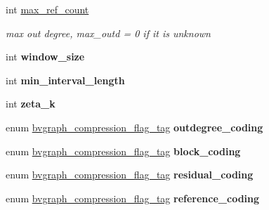 \begin{DoxyCompactItemize}
\item 
\hypertarget{structbvgraph__tag_a1acf7e4fb2fa3ba2f04dbc36933bd932}{int \hyperlink{structbvgraph__tag_a1acf7e4fb2fa3ba2f04dbc36933bd932}{max\+\_\+ref\+\_\+count}}\label{structbvgraph__tag_a1acf7e4fb2fa3ba2f04dbc36933bd932}

\begin{DoxyCompactList}\small\item\em max out degree, max\+\_\+outd = 0 if it is unknown \end{DoxyCompactList}\item 
\hypertarget{structbvgraph__tag_a69c3c3dbd6e4f186c34c31069b6c2c4c}{int {\bfseries window\+\_\+size}}\label{structbvgraph__tag_a69c3c3dbd6e4f186c34c31069b6c2c4c}

\item 
\hypertarget{structbvgraph__tag_a9ee97f273e2de17699a1da8e6c5caf62}{int {\bfseries min\+\_\+interval\+\_\+length}}\label{structbvgraph__tag_a9ee97f273e2de17699a1da8e6c5caf62}

\item 
\hypertarget{structbvgraph__tag_aa459ab6c562f5c09f9d6563a6fb4b8aa}{int {\bfseries zeta\+\_\+k}}\label{structbvgraph__tag_aa459ab6c562f5c09f9d6563a6fb4b8aa}

\item 
\hypertarget{structbvgraph__tag_a6e5fafe969bd141ec565aa2f21e8ce80}{enum \hyperlink{bvgraph_8h_a4ea6daab9cc8f1f480167ac67a2bf2c5}{bvgraph\+\_\+compression\+\_\+flag\+\_\+tag} {\bfseries outdegree\+\_\+coding}}\label{structbvgraph__tag_a6e5fafe969bd141ec565aa2f21e8ce80}

\item 
\hypertarget{structbvgraph__tag_a904a6123c2ea2d239cb4e9a5952865d3}{enum \hyperlink{bvgraph_8h_a4ea6daab9cc8f1f480167ac67a2bf2c5}{bvgraph\+\_\+compression\+\_\+flag\+\_\+tag} {\bfseries block\+\_\+coding}}\label{structbvgraph__tag_a904a6123c2ea2d239cb4e9a5952865d3}

\item 
\hypertarget{structbvgraph__tag_aaa2d03d5064007fda5339c24072d5620}{enum \hyperlink{bvgraph_8h_a4ea6daab9cc8f1f480167ac67a2bf2c5}{bvgraph\+\_\+compression\+\_\+flag\+\_\+tag} {\bfseries residual\+\_\+coding}}\label{structbvgraph__tag_aaa2d03d5064007fda5339c24072d5620}

\item 
\hypertarget{structbvgraph__tag_a5ba7fc4ec8e476a6273d9b6f611f710b}{enum \hyperlink{bvgraph_8h_a4ea6daab9cc8f1f480167ac67a2bf2c5}{bvgraph\+\_\+compression\+\_\+flag\+\_\+tag} {\bfseries reference\+\_\+coding}}\label{structbvgraph__tag_a5ba7fc4ec8e476a6273d9b6f611f710b}


\end{DoxyCompactItemize}
